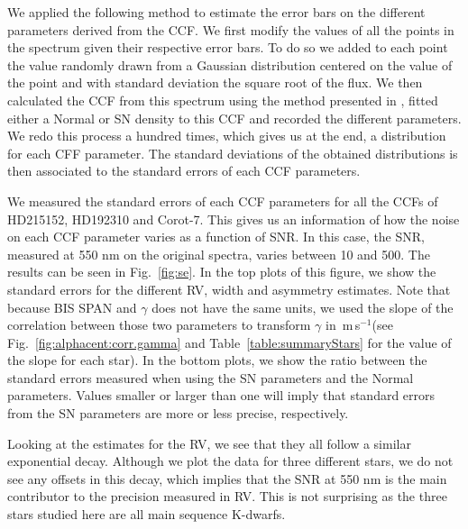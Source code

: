 \documentclass{aa}
\def\ms{\hbox{\,m\,s$^{-1}$}}         %
\begin{document}
We applied the following method to estimate the error bars on the different parameters derived from the CCF. We first modify the values of all the points in the spectrum given their respective error bars. To do so we added to each point the value randomly drawn from a Gaussian distribution centered on the value of the point and with standard deviation the square root of the flux. We then calculated the CCF from this spectrum using the method presented in \citet{Pepe-2002a}, fitted either a Normal or SN density to this CCF and recorded the different parameters. We redo this process a hundred times, which gives us at the end, a distribution for each CFF parameter. The standard deviations of the obtained distributions is then associated to the standard errors of each CCF parameters.

We measured the standard errors of each CCF parameters for all the CCFs of HD215152, HD192310 and Corot-7. This gives us an information of how the noise on each CCF parameter varies as a function of SNR. In this case, the SNR, measured at 550 nm on the original spectra, varies between 10 and 500. The results can be seen in Fig.~\ref{fig:se}. In the top plots of this figure, we show the standard errors for the different RV, width and asymmetry estimates. Note that because BIS SPAN and $\gamma$ does not have the same units, we used the slope of the correlation between those two parameters to transform $\gamma$ in \ms (see Fig.~\ref{fig:alphacent:corr.gamma} and Table~\ref{table:summaryStars} for the value of the slope for each star). In the bottom plots, we show the ratio between the standard errors measured when using the SN parameters and the Normal parameters. Values smaller or larger than one will imply that standard errors from the SN parameters are more or less precise, respectively.

Looking at the estimates for the RV, we see that they all follow a similar exponential decay. Although we plot the data for three different stars, we do not see any offsets in this decay, which implies that the SNR at 550 nm is the main contributor to the precision measured in RV. This is not surprising as the three stars studied here are all main sequence K-dwarfs. 
\end{document}
